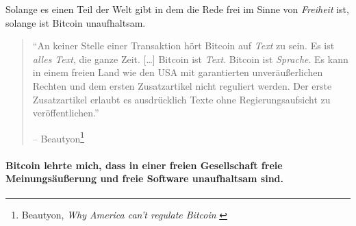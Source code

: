 Solange es einen Teil der Welt gibt in dem die Rede frei im Sinne von
\textit{Freiheit} ist, solange ist Bitcoin unaufhaltsam.

\begin{quotation}\begin{samepage}
\enquote{An keiner Stelle einer Transaktion hört Bitcoin auf \textit{Text} zu
sein. Es ist \textit{alles Text}, die ganze Zeit. [\ldots] Bitcoin ist
\textit{Text}. Bitcoin ist \textit{Sprache}. Es kann in einem freien Land wie
den USA mit garantierten unveräußerlichen Rechten und dem ersten Zusatzartikel
nicht reguliert werden. Der erste Zusatzartikel erlaubt es ausdrücklich Texte
ohne Regierungsaufsicht zu veröffentlichen.}

\begin{flushright} -- Beautyon\footnote{Beautyon, \textit{Why America can't regulate
Bitcoin} \cite{america-regulate-bitcoin}}
\end{flushright}\end{samepage}\end{quotation}

\paragraph{Bitcoin lehrte mich, dass in einer freien Gesellschaft freie
Meinungsäußerung und freie Software unaufhaltsam sind.}

%
%
%
%
%
%
%
